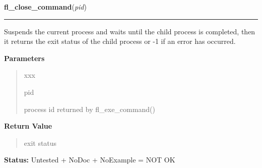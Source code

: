 \hspace{.8\funcindent}\begin{boxedminipage}{\funcwidth}

    \raggedright \textbf{fl\_close\_command}(\textit{pid})

    \vspace{-1.5ex}

    \rule{\textwidth}{0.5\fboxrule}
\setlength{\parskip}{2ex}
    Suspends the current process and waits until the child process is 
    completed, then it returns the exit status of the child process or -1 
    if an error has occurred.

\setlength{\parskip}{1ex}
      \textbf{Parameters}
      \vspace{-1ex}

      \begin{quote}
        \begin{Ventry}{xxx}

          \item[pid]

          process id returned by fl\_exe\_command()

        \end{Ventry}

      \end{quote}

      \textbf{Return Value}
    \vspace{-1ex}

      \begin{quote}
      exit status

      \end{quote}

\textbf{Status:} Untested + NoDoc + NoExample = NOT OK



    \end{boxedminipage}

    \label{xformslib:library:fl_check_command}

    \vspace{0.5ex}

